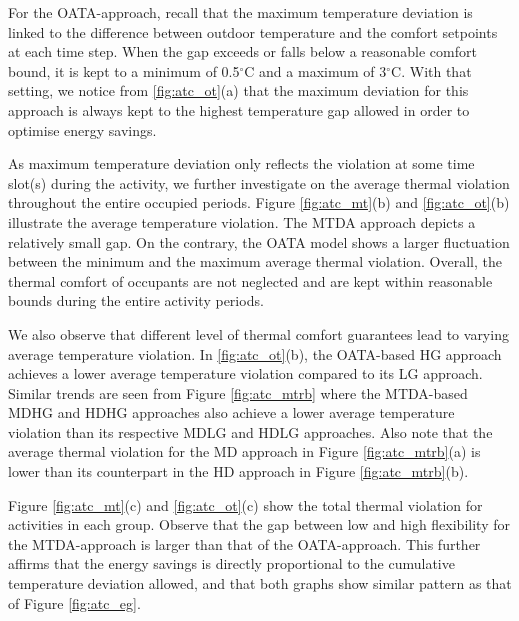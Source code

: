 For the OATA-approach, recall that the maximum temperature deviation is linked to the difference between outdoor temperature and the comfort setpoints at each time step. When the gap exceeds or falls below a reasonable comfort bound, it is kept to a minimum of 0.5$^\circ$C and a maximum of 3$^\circ$C. With that setting, we notice from \ref{fig:atc_ot}(a) that the maximum deviation for this approach is always kept to the highest temperature gap allowed in order to optimise energy savings.

As maximum temperature deviation only reflects the violation at some time slot(s) during the activity, we further investigate on the average thermal violation throughout the entire occupied periods. Figure \ref{fig:atc_mt}(b) and \ref{fig:atc_ot}(b) illustrate the average temperature violation. %
The MTDA approach depicts a relatively small gap. On the contrary, the OATA model shows a larger fluctuation between the minimum and the maximum average thermal violation. Overall, the thermal comfort of occupants are not neglected and are kept within reasonable bounds during the entire activity periods. 

We also observe that different level of thermal comfort guarantees lead to varying average temperature violation. In \ref{fig:atc_ot}(b),  the OATA-based HG approach achieves a lower average temperature violation compared to its LG approach. Similar trends are seen from Figure \ref{fig:atc_mtrb} where the MTDA-based MDHG and HDHG approaches also achieve a lower average temperature violation than its respective MDLG and HDLG approaches. Also note that the average thermal violation for the MD approach in Figure \ref{fig:atc_mtrb}(a) is lower than its counterpart in the HD approach in Figure \ref{fig:atc_mtrb}(b). 

Figure \ref{fig:atc_mt}(c) and \ref{fig:atc_ot}(c) show the total thermal violation for activities in each group. Observe that the gap between low and high flexibility for the MTDA-approach is larger than that of the OATA-approach. This further affirms that the energy savings is directly proportional to the cumulative temperature deviation allowed, and that both graphs show similar pattern as that of Figure \ref{fig:atc_eg}.


